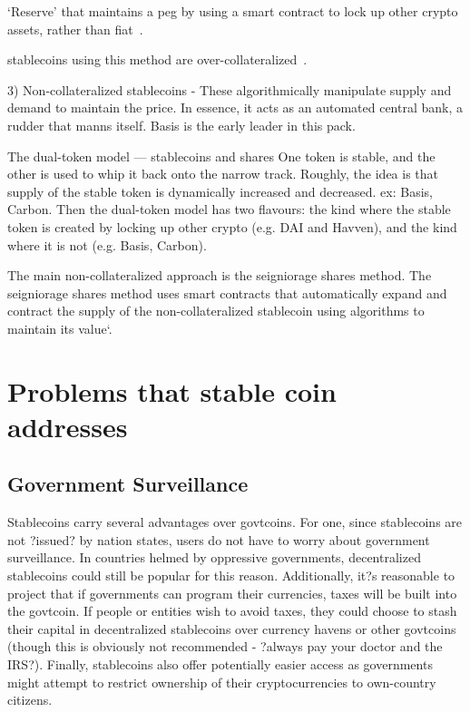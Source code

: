 ‘Reserve’ that maintains a peg by using a smart contract to lock up other crypto assets, rather than fiat~\cite{cointelegraph}.

stablecoins using this method are over-collateralized~\cite{overview}.

3) Non-collateralized stablecoins - These algorithmically manipulate supply and demand to maintain the price. In essence, it acts as an automated central bank, a rudder that manns itself. Basis is the early leader in this pack.

The dual-token model — stablecoins and shares One token is stable, and the other is used to whip it back onto the narrow track. Roughly, the idea is that supply of the stable token is dynamically increased and decreased. ex: Basis, Carbon. Then the dual-token model has two flavours: the kind where the stable token is created by locking up other crypto (e.g. DAI and Havven), and the kind where it is not (e.g. Basis, Carbon). ~\cite{cryptoinsider}

The main non-collateralized approach is the seigniorage shares method. The seigniorage shares method uses smart contracts that automatically expand and contract the supply of the non-collateralized stablecoin using algorithms to maintain its value`\cite{overview}.





\section{Problems that stable coin addresses} %
\subsection{Government Surveillance}
Stablecoins carry several advantages over govtcoins. For one, since stablecoins are not ?issued? by nation states, users do not have to worry about government surveillance. In countries helmed by oppressive governments, decentralized stablecoins could still be popular for this reason. Additionally, it?s reasonable to project that if governments can program their currencies, taxes will be built into the govtcoin. If people or entities wish to avoid taxes, they could choose to stash their capital in decentralized stablecoins over currency havens or other govtcoins (though this is obviously not recommended - ?always pay your doctor and the IRS?). Finally, stablecoins also offer potentially easier access as governments might attempt to restrict ownership of their cryptocurrencies to own-country citizens.

